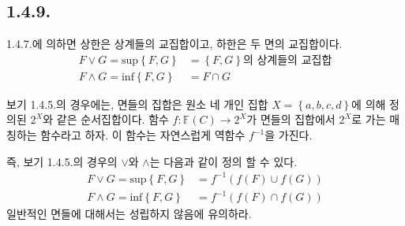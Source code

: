 \documentclass{article}
\begin{document}
\subsection{1.4.9.}
1.4.7.에 의하면 상한은 상계들의 교집합이고, 하한은 두 면의 교집합이다.
\begin{align*}
F \vee G = \text{sup}\left\{F, G\right\} &=  \text{$\left\{F, G\right\}$의 상계들의 교집합}
\\ F \wedge G = \text{inf}\left\{F, G\right\}  &= F \cap G
\end{align*}

보기 1.4.5.의 경우에는, 면들의 집합은 원소 네 개인 집합 $X = \left\{a, b, c, d\right\}$에 의해 정의된 $2^X$와 같은 순서집합이다. 함수 $f : \mathbb{F}(C) \rightarrow 2^X$가 면들의 집합에서 $2^X$로 가는 매칭하는 함수라고 하자. 이 함수는 자연스럽게 역함수 $f^{-1}$을 가진다. 

즉, 보기 1.4.5.의 경우의 $\vee$와 $\wedge$는 다음과 같이 정의 할 수 있다.
\begin{align*}
F \vee G = \text{sup}\left\{F, G\right\} &=  f^{-1}(f(F) \cup f(G))
\\ F \wedge G = \text{inf}\left\{F, G\right\}  &= f^{-1}(f(F) \cap f(G))
\end{align*}
일반적인 면들에 대해서는 성립하지 않음에 유의하라.
\end{document}
